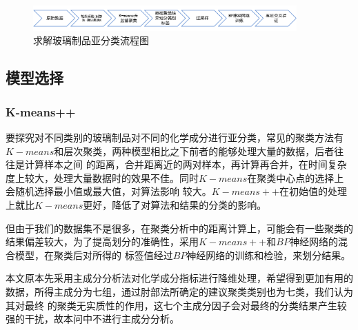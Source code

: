 \documentclass[UTF8]{ctexart}
\begin{document}
\begin{figure}[H]\centering
	\includegraphics[width=0.9\textwidth]{img/第二问流程图.png} %
	\caption{求解玻璃制品亚分类流程图} %
	\label{fig:figure 6} %
\end{figure}

\subsection{模型选择}




\subsubsection{K-means++}
要探究对不同类别的玻璃制品对不同的化学成分进行亚分类，常见的聚类方法有$K-means$和层次聚类，两种模型相比之下前者的能够处理大量的数据，后者往往是计算样本之间
的距离，合并距离近的两对样本，再计算再合并，在时间复杂度上较大，处理大量数据时的效果不佳。同时$K-means$在聚类中心点的选择上会随机选择最小值或最大值，对算法影响
较大。$K-means++$在初始值的处理上就比$K-means$更好，降低了对算法和结果的分类的影响。

但由于我们的数据集不是很多，在聚类分析中的距离计算上，可能会有一些聚类的结果偏差较大，为了提高划分的准确性，采用$K-means++$和$BP$神经网络的混合模型，在聚类后对所得的
标签值经过$BP$神经网络的训练和检验，来划分结果。

本文原本先采用主成分分析法对化学成分指标进行降维处理，希望得到更加有用的数据，所得主成分为七组，通过肘部法所确定的建议聚类类别也为七类，我们认为其对最终
的聚类无实质性的作用，这七个主成分因子会对最终的分类结果产生较强的干扰，故本问中不进行主成分分析。


\end{document}
